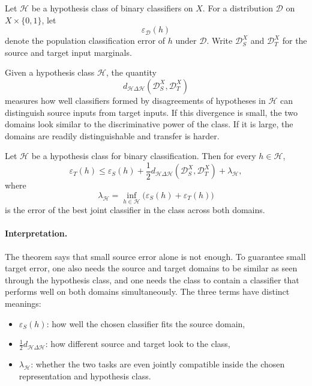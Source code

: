 Let $\mathcal{H}$ be a hypothesis class of binary classifiers on $X$.
For a distribution $\mathcal{D}$ on $X \times \{0,1\}$, let
\[
\varepsilon_{\mathcal{D}}(h)
\]
denote the population classification error of $h$ under $\mathcal{D}$.
Write $\mathcal{D}_S^X$ and $\mathcal{D}_T^X$ for the source and target input marginals.

\begin{definition}
Given a hypothesis class $\mathcal{H}$, the quantity
\[
d_{\mathcal{H}\Delta\mathcal{H}}(\mathcal{D}_S^X,\mathcal{D}_T^X)
\]
measures how well classifiers formed by disagreements of hypotheses in $\mathcal{H}$ can distinguish source inputs from target inputs.
If this divergence is small, the two domains look similar to the discriminative power of the class.
If it is large, the domains are readily distinguishable and transfer is harder.
\end{definition}

\begin{theorem}
Let $\mathcal{H}$ be a hypothesis class for binary classification.
Then for every $h \in \mathcal{H}$,
\[
\varepsilon_T(h)
\le
\varepsilon_S(h)
+ \frac{1}{2} d_{\mathcal{H}\Delta\mathcal{H}}(\mathcal{D}_S^X,\mathcal{D}_T^X)
+ \lambda_{\mathcal{H}},
\]
where
\[
\lambda_{\mathcal{H}} = \inf_{h \in \mathcal{H}} \bigl(\varepsilon_S(h) + \varepsilon_T(h)\bigr)
\]
is the error of the best joint classifier in the class across both domains.
\end{theorem}

\paragraph{Interpretation.}
The theorem says that small source error alone is not enough.
To guarantee small target error, one also needs the source and target domains to be similar as seen through the hypothesis class, and one needs the class to contain a classifier that performs well on both domains simultaneously.
The three terms have distinct meanings:
\begin{itemize}
    \item \(\varepsilon_S(h)\): how well the chosen classifier fits the source domain,
    \item \(\tfrac{1}{2} d_{\mathcal{H}\Delta\mathcal{H}}\): how different source and target look to the class,
    \item \(\lambda_{\mathcal{H}}\): whether the two tasks are even jointly compatible inside the chosen representation and hypothesis class.
\end{itemize}

